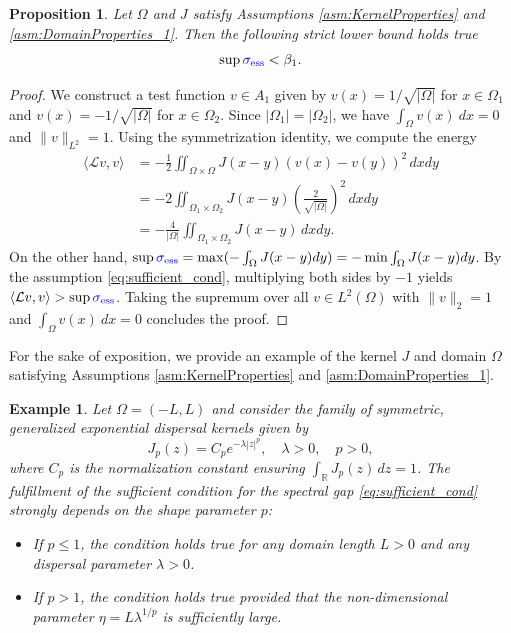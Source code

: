 \documentclass[12pt, a4paper]{article}
\newcommand{\revision}[1]{\textcolor{blue}{#1}}
\theoremstyle{break}
\theoremstyle{break}
\newtheorem{prp}{Proposition}[section]
\theoremstyle{break}
\theoremstyle{break}
\theoremstyle{break}
\theoremstyle{break}
\theoremstyle{break}
\theoremstyle{break}
\theoremstyle{break}
\newtheorem{example}{Example}[section]
\begin{document}
\begin{prp}
    \label{prop:spectral_gap}
    Let $\Omega$ and $J$ satisfy Assumptions \ref{asm:KernelProperties} and \ref{asm:DomainProperties_1}.
    Then the following strict lower bound holds true
    \begin{equation*}
        \sup \revision{\sigma_{\mathrm{ess}}} < \beta_1.
    \end{equation*}
\end{prp}
\begin{proof}
    We construct a test function $v \in A_1$ given by $v(x) = 1/\sqrt{|\Omega|}$ for $x \in \Omega_1$ and $v(x) = -1/\sqrt{|\Omega|}$ for $x \in \Omega_2$. Since $|\Omega_1|=|\Omega_2|$, we have $\int_\Omega v(x)\:dx = 0$ and $\|v\|_{L^2}=1$. Using the symmetrization identity, we compute the energy
    \begin{align*}
        \langle \mathcal{L}v, v \rangle &= -\frac{1}{2} \iint_{\Omega \times \Omega} J(x-y)(v(x)-v(y))^2 \, dx dy \\
        &= -2 \iint_{\Omega_1 \times \Omega_2} J(x-y) \left( \frac{2}{\sqrt{|\Omega|}} \right)^2 \, dx dy \\
        &= -\frac{4}{|\Omega|} \iint_{\Omega_1 \times \Omega_2} J(x-y) \, dx dy.
    \end{align*}
    On the other hand, $\sup \revision{\sigma_{\mathrm{ess}}} = \max (-\int_\Omega J(x-y)dy) = - \min \int_\Omega J(x-y)dy$. 
    By the assumption \eqref{eq:sufficient_cond}, multiplying both sides by $-1$ yields $\langle \mathcal{L}v, v \rangle > \sup \revision{\sigma_{\mathrm{ess}}}$. Taking the supremum over all $v \in L^2(\Omega)$ with $\|v\|_2 = 1$ and $\int_\Omega v(x)\:dx = 0$ concludes the proof.
\end{proof}

For the sake of exposition, we provide an example of the kernel $J$ and domain $\Omega$ satisfying Assumptions \ref{asm:KernelProperties} and \ref{asm:DomainProperties_1}.
\begin{example}
    \label{ex:generalized_exponential}
    Let $\Omega = (-L, L)$ and consider the family of symmetric, generalized exponential dispersal kernels given by
    \begin{equation}
        J_p(z) = C_p e^{-\lambda |z|^p}, \quad \lambda > 0, \quad p > 0,
    \end{equation}
    where $C_p$ is the normalization constant ensuring $\int_{\mathbb{R}} J_p(z) \, dz = 1$. The fulfillment of the sufficient condition for the spectral gap \eqref{eq:sufficient_cond} strongly depends on the shape parameter $p$:
    \begin{itemize}
        \item If $p \le 1$, the condition holds true for any domain length $L > 0$ and any dispersal parameter $\lambda > 0$.
        \item If $p > 1$, the condition holds true provided that the non-dimensional parameter $\eta = L\lambda^{1/p}$ is sufficiently large.
    \end{itemize}
\end{example}
\end{document}
